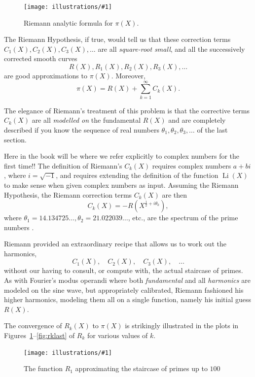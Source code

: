 \documentclass[openany]{book}
\DeclareMathOperator{\Li}{Li}
\newcommand{\ill}[3]{%
   \begin{figure}[H]%
   \vspace{-2ex}
   \centering%
   \texttt{[image: illustrations/\#1]}%
   \caption{#3}%
   \vspace{-2ex}
    \end{figure}}
\theoremstyle{plain}
\theoremstyle{definition}
\newcommand{\RH}{Riemann Hypothesis\index{Riemann Hypothesis}}
\begin{document}
\ill{riemann_Rk}{0.8}{Riemann analytic formula for $\pi(X)$.}

The \RH{}, if true, would tell us that these correction
terms $C_1(X), C_2(X), C_3(X),\dots$ are all {\em square-root small},
and all the successively corrected smooth curves $$R(X), R_1(X),
R_2(X),R_3(X),\dots$$ are good approximations to $\pi(X)$.
Moreover, 
$$
 \pi(X) = R(X) + \sum_{k=1}^{\infty} C_k(X).
$$

The elegance of Riemann's treatment of this problem is that the
corrective terms $C_k(X)$ are all {\em modelled on} the fundamental
$R(X)$ and are completely described if you know the sequence of real
numbers $\theta_1, \theta_2, \theta_3,\dots$ of the last section.


Here in the book will be where we refer explicitly to complex numbers
for the first time!!  The definition of Riemann's $C_k(X)$ requires
complex numbers $a+bi$, where $i=\sqrt{-1}$, and requires extending
the definition of the function $\Li(X)$ to make sense when given
complex numbers as input.  Assuming the \RH{}, the Riemann correction
terms $C_k(X)$ are then
$$
   C_k(X)= -R(X^{\frac{1}{2} + i\theta_k}), 
$$
where $\theta_1 = 14.134725\dots, \theta_2 = 21.022039\dots$, etc.,
are the spectrum of the prime numbers .

Riemann provided an extraordinary recipe that allows us to work
out the harmonics, $$C_1(X),\quad C_2(X),\quad C_3(X),\quad \dots$$ without our having
to consult, or compute with, the actual staircase of primes. As with
Fourier's modus operandi where both {\em fundamental} and all {\em
  harmonics} are modeled on the sine wave, but appropriately
calibrated, Riemann fashioned his higher harmonics, modeling them all
on a single function, namely his initial guess $R(X)$.

The convergence of $R_k(X)$ to $\pi(X)$ is strikingly illustrated
in the plots in Figures~\ref{fig:rkfirst}--\ref{fig:rklast} of $R_k$ for various values of $k$.
 
  
\ill{Rk_1_2_100}{.9}{The function $R_{1}$ approximating the staircase of primes up to $100$\label{fig:rkfirst}}
\end{document}
